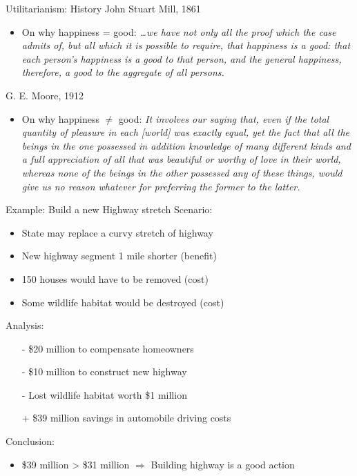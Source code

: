 \documentclass{beamer}
\begin{document}
\begin{frame}{Utilitarianism: History}
John Stuart Mill, 1861
\begin{itemize}
\item On why happiness = good: \textit{\ldots we have not only all the proof which the case admits of, but all which it is possible to require, that happiness is a good: that each person's happiness is a good to that person, and the general happiness, therefore, a good to the aggregate of all persons.}
\end{itemize}
\pause
G. E. Moore, 1912
\begin{itemize}
\item On why happiness $\neq$ good: \textit{It involves our saying that, even if the total quantity of pleasure in each [world] was exactly equal, yet the fact that all the beings in the one possessed in addition knowledge of many different kinds and a full appreciation of all that was beautiful or worthy of love in their world, whereas none of the beings in the other possessed any of these things, would give us no reason whatever for preferring the former to the latter.}
\end{itemize}
\end{frame}

\begin{frame}{Example: Build a new Highway stretch}
Scenario:
  \begin{itemize}
  \item State may replace a curvy stretch of highway
  \item New highway segment 1 mile shorter (benefit)
  \item 150 houses would have to be removed (cost)
  \item Some wildlife habitat would be destroyed (cost)
  \end{itemize}
\pause
Analysis:
  \begin{itemize}
  \item[-] \$20 million to compensate homeowners
  \item[-] \$10 million to construct new highway
  \item[-] Lost wildlife habitat worth \$1 million
  \item[+] \$39 million savings in automobile driving costs
  \end{itemize}
\pause
Conclusion:
\begin{itemize}
\item \$39 million > \$31 million $\Rightarrow$ Building highway is a good action
\end{itemize}
\end{frame}
\end{document}

